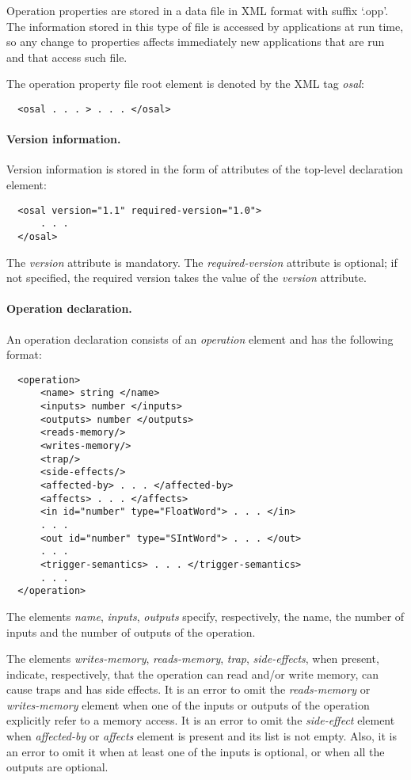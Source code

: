 \documentclass[twoside]{tce}
\begin{document}
Operation properties are stored in a data file in XML format with suffix
`.opp'.  The information stored in this type of file is accessed by
applications at run time, so any change to properties affects immediately
new applications that are run and that access such file.

The operation property file root element is denoted by the XML tag
\emph{osal}:
\begin{verbatim}
  <osal . . . > . . . </osal>
\end{verbatim}

\paragraph{Version information.}
Version information is stored in the form of attributes of the top-level
declaration element:
\begin{verbatim}
  <osal version="1.1" required-version="1.0">
      . . .
  </osal>
\end{verbatim}

The \emph{version} attribute is mandatory.  The \emph{required-version}
attribute is optional; if not specified, the required version takes the
value of the \emph{version} attribute.

\paragraph{Operation declaration.}

An operation declaration consists of an \emph{operation} element and has the
following format:
\begin{verbatim}
  <operation>
      <name> string </name>
      <inputs> number </inputs>
      <outputs> number </outputs>
      <reads-memory/>
      <writes-memory/>
      <trap/>
      <side-effects/>
      <affected-by> . . . </affected-by>
      <affects> . . . </affects>
      <in id="number" type="FloatWord"> . . . </in>
      . . .
      <out id="number" type="SIntWord"> . . . </out>
      . . .
      <trigger-semantics> . . . </trigger-semantics>
      . . .
  </operation>
\end{verbatim}

The elements \emph{name}, \emph{inputs}, \emph{outputs} specify,
respectively, the name, the number of inputs and the number of outputs of
the operation.

The elements \emph{writes-memory}, \emph{reads-memory}, \emph{trap}, 
\emph{side-effects}, when present, indicate, respectively, that the operation 
can read and/or write memory, can cause traps and has side effects.
%
It is an error to omit the \emph{reads-memory} or \emph{writes-memory} element 
when one of the inputs or outputs of the operation explicitly refer to 
a memory access.
%
It is an error to omit the \emph{side-effect} element when
\emph{affected-by} or \emph{affects} element is present and its list is not
empty.  Also, it is an error to omit it when at least one of the inputs is
optional, or when all the outputs are optional.
\end{document}
